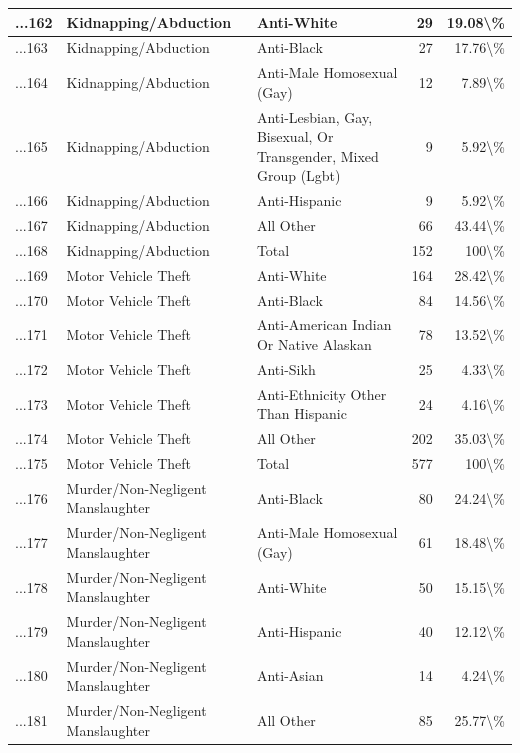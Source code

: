 \documentclass[
]{krantz}
\begin{document}
\begin{longtable}[t]{l|l|l|r|r}
\hline
...162 & Kidnapping/Abduction & Anti-White & 29 & 19.08\textbackslash{}\%\\
\hline
...163 & Kidnapping/Abduction & Anti-Black & 27 & 17.76\textbackslash{}\%\\
\hline
...164 & Kidnapping/Abduction & Anti-Male Homosexual (Gay) & 12 & 7.89\textbackslash{}\%\\
\hline
...165 & Kidnapping/Abduction & Anti-Lesbian, Gay, Bisexual, Or Transgender, Mixed Group (Lgbt) & 9 & 5.92\textbackslash{}\%\\
\hline
...166 & Kidnapping/Abduction & Anti-Hispanic & 9 & 5.92\textbackslash{}\%\\
\hline
...167 & Kidnapping/Abduction & All Other & 66 & 43.44\textbackslash{}\%\\
\hline
...168 & Kidnapping/Abduction & Total & 152 & 100\textbackslash{}\%\\
\hline
...169 & Motor Vehicle Theft & Anti-White & 164 & 28.42\textbackslash{}\%\\
\hline
...170 & Motor Vehicle Theft & Anti-Black & 84 & 14.56\textbackslash{}\%\\
\hline
...171 & Motor Vehicle Theft & Anti-American Indian Or Native Alaskan & 78 & 13.52\textbackslash{}\%\\
\hline
...172 & Motor Vehicle Theft & Anti-Sikh & 25 & 4.33\textbackslash{}\%\\
\hline
...173 & Motor Vehicle Theft & Anti-Ethnicity Other Than Hispanic & 24 & 4.16\textbackslash{}\%\\
\hline
...174 & Motor Vehicle Theft & All Other & 202 & 35.03\textbackslash{}\%\\
\hline
...175 & Motor Vehicle Theft & Total & 577 & 100\textbackslash{}\%\\
\hline
...176 & Murder/Non-Negligent Manslaughter & Anti-Black & 80 & 24.24\textbackslash{}\%\\
\hline
...177 & Murder/Non-Negligent Manslaughter & Anti-Male Homosexual (Gay) & 61 & 18.48\textbackslash{}\%\\
\hline
...178 & Murder/Non-Negligent Manslaughter & Anti-White & 50 & 15.15\textbackslash{}\%\\
\hline
...179 & Murder/Non-Negligent Manslaughter & Anti-Hispanic & 40 & 12.12\textbackslash{}\%\\
\hline
...180 & Murder/Non-Negligent Manslaughter & Anti-Asian & 14 & 4.24\textbackslash{}\%\\
\hline
...181 & Murder/Non-Negligent Manslaughter & All Other & 85 & 25.77\textbackslash{}\%\\

\end{longtable}
\end{document}

